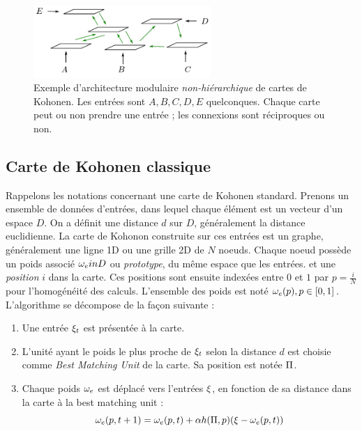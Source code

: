 \begin{figure}
\centering
\includegraphics[width=0.6\textwidth]{architecture.pdf}
\caption{Exemple d'architecture modulaire \emph{non-hiérarchique} de cartes de Kohonen. Les entrées sont $A,B,C,D,E$ quelconques. Chaque carte peut ou non prendre une entrée ; les connexions sont réciproques ou non.}
\label{fig:archi_non_hierarchique}
\end{figure}
%



\subsection{Carte de Kohonen classique}

Rappelons les notations concernant une carte de Kohonen standard. Prenons un ensemble de données d'entrées, dans lequel chaque élément est un vecteur d'un espace $D$. On a définit une distance $d$ sur $D$, généralement la distance euclidienne.
La carte de Kohonon construite sur ces entrées est un graphe, généralement une ligne 1D ou une grille 2D de $N$ noeuds. Chaque noeud possède un poids associé $\omega_e in D$ ou \emph{prototype}, du même espace que les entrées. et une \emph{position} $i$ dans la carte. Ces positions sont ensuite indexées entre $0$ et $1$ par $p= \frac{i}{N}$ pour l'homogénéité des calculs. 
L'ensemble des poids est noté ${\omega_e(p), p \in [0,1]}$. 
L'algorithme se décompose de la façon suivante :

\begin{enumerate}
\item Une entrée $\xi_t$ est présentée à la carte.
\item L'unité ayant le poids le plus proche de $\xi_t$ selon la distance $d$ est choisie comme \emph{Best Matching Unit} de la carte. Sa position est notée $\Pi$.
\item Chaque poids $\omega_e$ est déplacé vers l'entrées $\xi$, en fonction de sa distance dans la carte à la best matching unit : 
\begin{equation}
\omega_e(p,t+1) = \omega_e(p,t) + \alpha h(\Pi,p)(\xi - \omega_e(p,t))
\label{eq:update}
\end{equation}

\end{enumerate}

